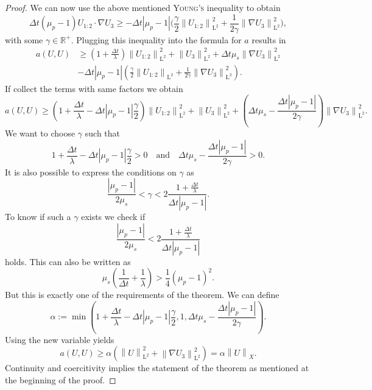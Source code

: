 \documentclass[12pt,a4paper,twoside, open=right]{scrreprt}
\theoremstyle{definition}
\theoremstyle{plain}
\newcommand{\abs}[1]{\left\vert #1\right\vert}
\newcommand{\rr}{\mathbb{R}}
\newcommand{\norm}[1]{\left\lVert#1\right\rVert}
\newcommand{\ltnorm}[1]{\norm{#1}_{\mathrm{L}^2}}
\begin{document}
\begin{proof}
    We can now use the above mentioned \textsc{Young's} inequality to obtain
    \begin{equation}
        \Delta t(\mu_p-1)U_{1:2}\cdot \nabla U_3\ge -\Delta t\abs{\mu_p-1}\big(\frac{\gamma}{2}\ltnorm{U_{1:2}}^2+\frac{1}{2\gamma}\ltnorm{\nabla U_3}^2\big),
    \end{equation}with some $\gamma\in\rr^+$. Plugging this inequality into the formula for $a$ results in
    \begin{align}
        a(U,U)&\ge \left(1+\frac{\Delta t}{\lambda}\right)\ltnorm{U_{1:2}}^2+\ltnorm{U_3}^2+\Delta t\mu_s\ltnorm{\nabla U_3}^2\\&-\Delta t\abs{\mu_p-1}\left(\frac{\gamma}{2}\ltnorm{U_{1:2}}+\frac{1}{2\gamma}\ltnorm{\nabla U_3}^2\right).
    \end{align}
    If collect the terms with same factors we obtain
    \begin{equation}
        a(U,U)\ge \left(1+\frac{\Delta t}{\lambda}-\Delta t\abs{\mu_p-1}\frac{\gamma}{2}\right)\ltnorm{U_{1:2}}^2+\ltnorm{U_3}^2+\left(\Delta t\mu_s-\frac{\Delta t\abs{\mu_p -1}}{2\gamma}\right)\ltnorm{\nabla U_3}^2.
    \end{equation}
    We want to choose $\gamma$ such that 
    \begin{equation}
        1+\frac{\Delta t}{\lambda}-\Delta t\abs{\mu_p-1}\frac{\gamma}{2}>0 \quad\text{and}\quad\Delta t\mu_s-\frac{\Delta t\abs{\mu_p -1}}{2\gamma}>0.
    \end{equation}
    It is also possible to express the conditions on $\gamma$ as
    \begin{equation}
        \frac{\abs{\mu_p-1} }{2\mu_s}<\gamma<2\frac{1+\frac{\Delta t}{\lambda}}{\Delta t\abs{\mu_p -1}}.
    \end{equation}
    To know if such a $\gamma$ exists we check if
    \begin{equation}
       \frac{\abs{\mu_p-1} }{2\mu_s}<2\frac{1+\frac{\Delta t}{\lambda}}{\Delta t\abs{\mu_p -1}}
    \end{equation}
    holds. This can also be written as
    \begin{equation}
        \mu_s\left(\frac{1}{\Delta t}+\frac{1}{\lambda}\right)>\frac{1}{4}(\mu_p-1)^2.
    \end{equation}
    But this is exactly one of the requirements of the theorem. We can define 
    \begin{equation}
        \alpha:=\min(1+\frac{\Delta t}{\lambda}-\Delta t\abs{\mu_p-1}\frac{\gamma}{2},1,\Delta t\mu_s-\frac{\Delta t\abs{\mu_p -1}}{2\gamma}).
    \end{equation}
    Using the new variable yields
    \begin{equation}
        a(U,U)\ge \alpha(\ltnorm{U}^2+\ltnorm{\nabla U_3}^2)=\alpha\norm{U}_X.
    \end{equation}
    Continuity and coercitivity implies the statement of the theorem as mentioned at the beginning of the proof.
\end{proof}
\end{document}
